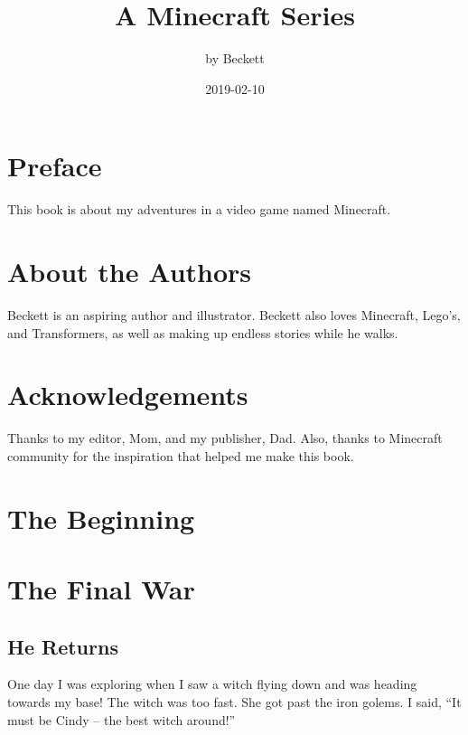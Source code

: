 \documentclass[12pt,twoside]{krantz}
\title{A Minecraft Series}
\author{by Beckett}
\date{2019-02-10}
\begin{document}
\maketitle

{
\setcounter{tocdepth}{1}
\tableofcontents
}
\hypertarget{preface}{%
\chapter*{Preface}\label{preface}}


This book is about my adventures in a video game named Minecraft.

\hypertarget{about-the-authors}{%
\chapter*{About the Authors}\label{about-the-authors}}


Beckett is an aspiring author and illustrator. Beckett also loves
Minecraft, Lego's, and Transformers, as well as making up endless
stories while he walks.

\hypertarget{acknowledgements}{%
\chapter*{Acknowledgements}\label{acknowledgements}}


Thanks to my editor, Mom, and my publisher, Dad. Also, thanks to
Minecraft community for the inspiration that helped me make this book.

\hypertarget{the-beginning}{%
\chapter{The Beginning}\label{the-beginning}}

\hypertarget{the-final-war}{%
\chapter{The Final War}\label{the-final-war}}

\hypertarget{he-returns}{%
\section{He Returns}\label{he-returns}}

One day I was exploring when I saw a witch flying down and was heading
towards my base! The witch was too fast. She got past the iron golems. I
said, ``It must be Cindy -- the best witch around!''
\end{document}
